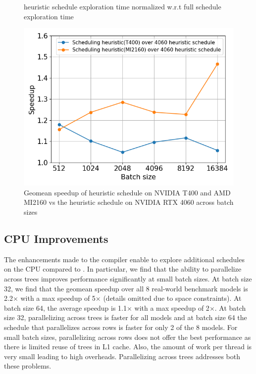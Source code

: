 \begin{figure}[htb]
\begin{minipage}[t]{.3\linewidth}
{  heuristic schedule exploration time normalized w.r.t full schedule exploration time}
  \label{Fig:HeuristicVsFullExplore_Speedup}
\end{minipage}
\hspace{0.5cm}
\begin{minipage}[t]{.3\linewidth}
  \centering
  \includegraphics[width=\linewidth]{figures/geomean_speedup_T400_4060_vs_T400_vs_MI2160.png}
  \caption{Geomean speedup of heuristic schedule on NVIDIA T400 and AMD MI2160 vs 
  the heuristic schedule on NVIDIA RTX 4060 across batch sizes}
  \label{Fig:AutotuningSpeedupvs4060Sched}
\end{minipage}
\end{figure}

\subsection{CPU Improvements}
The enhancements made to the compiler enable \Treebeard{} to explore additional schedules on the CPU
compared to \TreebeardOLD{}. 
In particular, we find that the ability to parallelize across trees improves performance 
significantly at small batch sizes. At batch size 32, we find that the geomean speedup over 
all 8 real-world benchmark models is 2.2$\times$ with a max speedup of 5$\times$ (details omitted 
due to space constraints). At batch size 64, the average speedup
is 1.1$\times$ with a max speedup of 2$\times$. At batch size 32, parallelizing across trees is faster 
for all models and at batch size 64 the \TreebeardOLD{} schedule that parallelizes across 
rows is faster for only 2 of the 8 models. For small batch sizes, parallelizing across rows does 
not offer the best performance as there is limited reuse of trees in L1 cache.
Also, the amount of work per thread is very small leading to high overheads. 
Parallelizing across trees addresses both these problems. 

